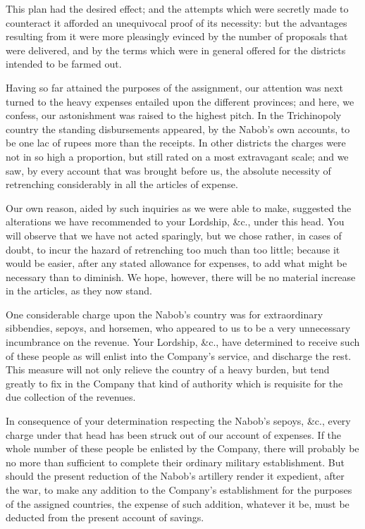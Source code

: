 This plan had the desired effect; and the attempts which were secretly made to counteract it afforded an unequivocal proof of its necessity: but the advantages resulting from it were more pleasingly evinced by the number of proposals that were delivered, and by the terms which were in general offered for the districts intended to be farmed out.

Having so far attained the purposes of the assignment, our attention was next turned to the heavy expenses entailed upon the different provinces; and here, we confess, our astonishment was raised to the highest pitch. In the Trichinopoly country the standing disbursements appeared, by the Nabob's own accounts, to be one lac of rupees more than the receipts. In other districts the charges were not in so high a proportion, but still rated on a most extravagant scale; and we saw, by every account that was brought before us, the absolute necessity of retrenching considerably in all the articles of expense.

Our own reason, aided by such inquiries as we were able to make, suggested the alterations we have recommended to your Lordship, \&c., under this head. You will observe that we have not acted sparingly, but we chose rather, in cases of doubt, to incur the hazard of retrenching too much than too little; because it would be easier, after any stated allowance for expenses, to add what might be necessary than to diminish. We hope, however, there will be no material increase in the articles, as they now stand.

One considerable charge upon the Nabob's country was for extraordinary sibbendies, sepoys, and horsemen, who appeared to us to be a very unnecessary incumbrance on the revenue. Your Lordship, \&c., have determined to receive such of these people as will enlist into the Company's service, and discharge the rest. This measure will not only relieve the country of a heavy burden, but tend greatly to fix in the Company that kind of authority which is requisite for the due collection of the revenues.

In consequence of your determination respecting the Nabob's sepoys, \&c., every charge under that head has been struck out of our account of expenses. If the whole number of these people be enlisted by the Company, there will probably be no more than sufficient to complete their ordinary military establishment. But should the present reduction of the Nabob's artillery render it expedient, after the war, to make any addition to the Company's establishment for the purposes of the assigned countries, the expense of such addition, whatever it be, must be deducted from the present account of savings.

